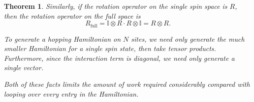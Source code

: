 \documentclass{article}
\newtheorem{theorem}{Theorem}[section]
\theoremstyle{definition}
\begin{document}
\begin{theorem}
Similarly, if the rotation operator on the single spin space is $R$, then the rotation operator on the full space is
\begin{equation}
R_\text{full} = \mathbb{I} \otimes R \cdot R \otimes \mathbb{I} = R \otimes R.
\end{equation}

To generate a hopping Hamiltonian on $N$ sites, we need only generate the much smaller Hamiltonian for a single spin state, then take tensor products. Furthermore, since the interaction term is diagonal, we need only generate a single vector. 

Both of these facts limits the amount of work required considerably compared with looping over every entry in the Hamiltonian.
\end{theorem}
\end{document}
